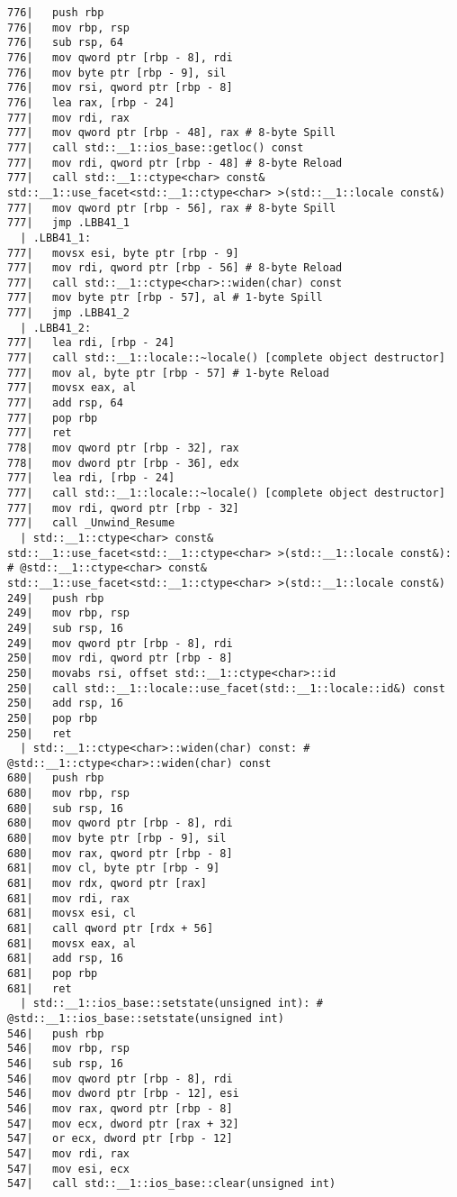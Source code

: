 \begin{lstlisting}[language={},numbers=none,title=\href{https://godbolt.org/z/hwKje8}{\texttt{godbolt.org/z/hwKje8}}]
776|   push rbp
776|   mov rbp, rsp
776|   sub rsp, 64
776|   mov qword ptr [rbp - 8], rdi
776|   mov byte ptr [rbp - 9], sil
776|   mov rsi, qword ptr [rbp - 8]
776|   lea rax, [rbp - 24]
777|   mov rdi, rax
777|   mov qword ptr [rbp - 48], rax # 8-byte Spill
777|   call std::__1::ios_base::getloc() const
777|   mov rdi, qword ptr [rbp - 48] # 8-byte Reload
777|   call std::__1::ctype<char> const& std::__1::use_facet<std::__1::ctype<char> >(std::__1::locale const&)
777|   mov qword ptr [rbp - 56], rax # 8-byte Spill
777|   jmp .LBB41_1
  | .LBB41_1:
777|   movsx esi, byte ptr [rbp - 9]
777|   mov rdi, qword ptr [rbp - 56] # 8-byte Reload
777|   call std::__1::ctype<char>::widen(char) const
777|   mov byte ptr [rbp - 57], al # 1-byte Spill
777|   jmp .LBB41_2
  | .LBB41_2:
777|   lea rdi, [rbp - 24]
777|   call std::__1::locale::~locale() [complete object destructor]
777|   mov al, byte ptr [rbp - 57] # 1-byte Reload
777|   movsx eax, al
777|   add rsp, 64
777|   pop rbp
777|   ret
778|   mov qword ptr [rbp - 32], rax
778|   mov dword ptr [rbp - 36], edx
777|   lea rdi, [rbp - 24]
777|   call std::__1::locale::~locale() [complete object destructor]
777|   mov rdi, qword ptr [rbp - 32]
777|   call _Unwind_Resume
  | std::__1::ctype<char> const& std::__1::use_facet<std::__1::ctype<char> >(std::__1::locale const&): # @std::__1::ctype<char> const& std::__1::use_facet<std::__1::ctype<char> >(std::__1::locale const&)
249|   push rbp
249|   mov rbp, rsp
249|   sub rsp, 16
249|   mov qword ptr [rbp - 8], rdi
250|   mov rdi, qword ptr [rbp - 8]
250|   movabs rsi, offset std::__1::ctype<char>::id
250|   call std::__1::locale::use_facet(std::__1::locale::id&) const
250|   add rsp, 16
250|   pop rbp
250|   ret
  | std::__1::ctype<char>::widen(char) const: # @std::__1::ctype<char>::widen(char) const
680|   push rbp
680|   mov rbp, rsp
680|   sub rsp, 16
680|   mov qword ptr [rbp - 8], rdi
680|   mov byte ptr [rbp - 9], sil
680|   mov rax, qword ptr [rbp - 8]
681|   mov cl, byte ptr [rbp - 9]
681|   mov rdx, qword ptr [rax]
681|   mov rdi, rax
681|   movsx esi, cl
681|   call qword ptr [rdx + 56]
681|   movsx eax, al
681|   add rsp, 16
681|   pop rbp
681|   ret
  | std::__1::ios_base::setstate(unsigned int): # @std::__1::ios_base::setstate(unsigned int)
546|   push rbp
546|   mov rbp, rsp
546|   sub rsp, 16
546|   mov qword ptr [rbp - 8], rdi
546|   mov dword ptr [rbp - 12], esi
546|   mov rax, qword ptr [rbp - 8]
547|   mov ecx, dword ptr [rax + 32]
547|   or ecx, dword ptr [rbp - 12]
547|   mov rdi, rax
547|   mov esi, ecx
547|   call std::__1::ios_base::clear(unsigned int)

\end{lstlisting}
